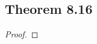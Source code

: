 \documentclass[../../main.tex]{subfiles}
\begin{document}
\subsection{Theorem 8.16}
\begin{wts}

\end{wts}
\begin{proof}

\end{proof}
\end{document}
